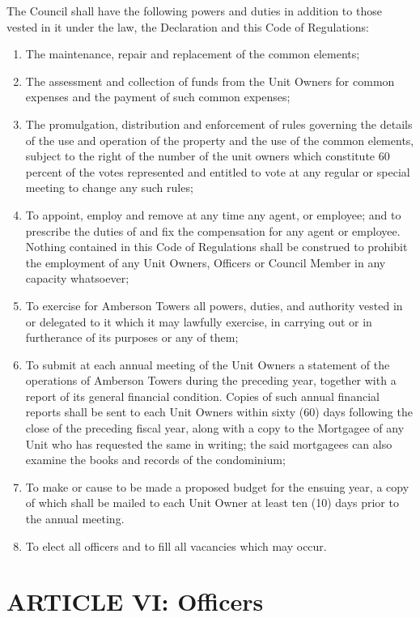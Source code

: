\documentclass[
]{book}
\begin{document}
The Council shall have the following powers and duties in addition to those vested in it under the law, the Declaration and this Code of Regulations:

\begin{enumerate}
\def\labelenumi{(\alph{enumi})}
\item
  The maintenance, repair and replacement of the common elements;
\item
  The assessment and collection of funds from the Unit Owners for common expenses and the payment of such common expenses;
\item
  The promulgation, distribution and enforcement of rules governing the details of the use and operation of the property and the use of the common elements, subject to the right of the number of the unit owners which constitute 60 percent of the votes represented and entitled to vote at any regular or special meeting to change any such rules;
\item
  To appoint, employ and remove at any time any agent, or employee; and to prescribe the duties of and fix the compensation for any agent or employee. Nothing contained in this Code of Regulations shall be construed to prohibit the employment of any Unit Owners, Officers or Council Member in any capacity whatsoever;
\item
  To exercise for Amberson Towers all powers, duties, and authority vested in or delegated to it which it may lawfully exercise, in carrying out or in furtherance of its purposes or any of them;
\item
  To submit at each annual meeting of the Unit Owners a statement of the operations of Amberson Towers during the preceding year, together with a report of its general financial condition. Copies of such annual financial reports shall be sent to each Unit Owners within sixty (60) days following the close of the preceding fiscal year, along with a copy to the Mortgagee of any Unit who has requested the same in writing; the said mortgagees can also examine the books and records of the condominium;
\item
  To make or cause to be made a proposed budget for the ensuing year, a copy of which shall be mailed to each Unit Owner at least ten (10) days prior to the annual meeting.
\item
  To elect all officers and to fill all vacancies which may occur.
\end{enumerate}

\hypertarget{article-vi-officers}{%
\section*{ARTICLE VI: Officers}\label{article-vi-officers}}
\end{document}
